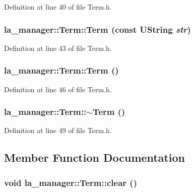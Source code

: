 Definition at line 40 of file Term.h.\hypertarget{classla__manager_1_1Term_49f7d019382b79db90b59acc1bedcb2e}{
\subsubsection[{Term}]{\setlength{\rightskip}{0pt plus 5cm}la\_\-manager::Term::Term (const UString {\em str})}}
\label{classla__manager_1_1Term_49f7d019382b79db90b59acc1bedcb2e}




Definition at line 43 of file Term.h.\hypertarget{classla__manager_1_1Term_0c8141cae425201896fefd48f1d5801e}{
\subsubsection[{Term}]{\setlength{\rightskip}{0pt plus 5cm}la\_\-manager::Term::Term ()}}
\label{classla__manager_1_1Term_0c8141cae425201896fefd48f1d5801e}




Definition at line 46 of file Term.h.\hypertarget{classla__manager_1_1Term_92895b8a4abc28c7694ab188369ea5e7}{
\subsubsection[{$\sim$Term}]{\setlength{\rightskip}{0pt plus 5cm}la\_\-manager::Term::$\sim$Term ()}}
\label{classla__manager_1_1Term_92895b8a4abc28c7694ab188369ea5e7}




Definition at line 49 of file Term.h.

\subsection{Member Function Documentation}
\hypertarget{classla__manager_1_1Term_b983fdd373e53addabc00c3a48a46df2}{
\subsubsection[{clear}]{\setlength{\rightskip}{0pt plus 5cm}void la\_\-manager::Term::clear ()}}
\label{classla__manager_1_1Term_b983fdd373e53addabc00c3a48a46df2}





